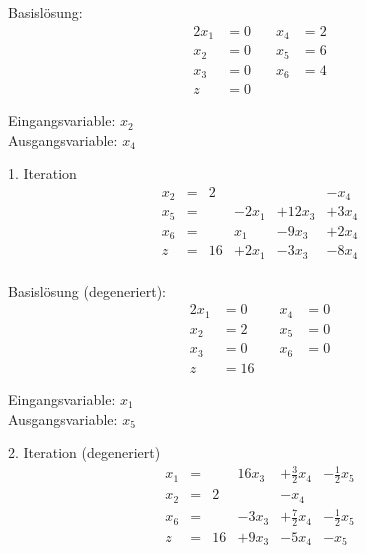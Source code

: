 \documentclass[a4paper]{scrartcl}
\begin{document}
\begin{enumerate}
        Basislösung:
        \begin{alignat*}{2}
            x_1 &= 0 &\quad x_4 &= 2 \\
            x_2 &= 0 &\quad x_5 &= 6 \\
            x_3 &= 0 &\quad x_6 &= 4 \\
            z &= 0
        \end{alignat*}

        Eingangsvariable: $x_2$ \\
        Ausgangsvariable: $x_4$

        1. Iteration
        \begin{equation}
            \begin{array}{rcrrrr}
                x_2 & = & 2 &  &  & -x_4 \\
                x_5 & = &   & -2x_1 & + 12x_3 & +3x_4 \\
                x_6 & = &   & x_1 & -9x_3 & +2x_4 \\
                \hline
                z   & = & 16 & + 2x_1 & -3x_3 & -8x_4 \\
            \end{array}
        \end{equation}

        Basislösung (degeneriert):
        \begin{alignat*}{2}
            x_1 &= 0 &\quad x_4 &= 0 \\
            x_2 &= 2 &\quad x_5 &= 0 \\
            x_3 &= 0 &\quad x_6 &= 0 \\
            z &= 16
        \end{alignat*}

        Eingangsvariable: $x_1$ \\
        Ausgangsvariable: $x_5$

        2. Iteration (degeneriert)
        \begin{equation}
            \begin{array}{rcrrrr}
                x_1 & = &   & 16x_3 & +\frac{3}{2}x_4 & -\frac{1}{2}x_5 \\
                x_2 & = & 2 &  & -x_4 & \\
                x_6 & = &   & -3x_3 & +\frac{7}{2}x_4 & -\frac{1}{2}x_5 \\
                \hline
                z   & = & 16 & +9x_3 & -5x_4 & -x_5\\
            \end{array}
        \end{equation}


\end{enumerate}
\end{document}
